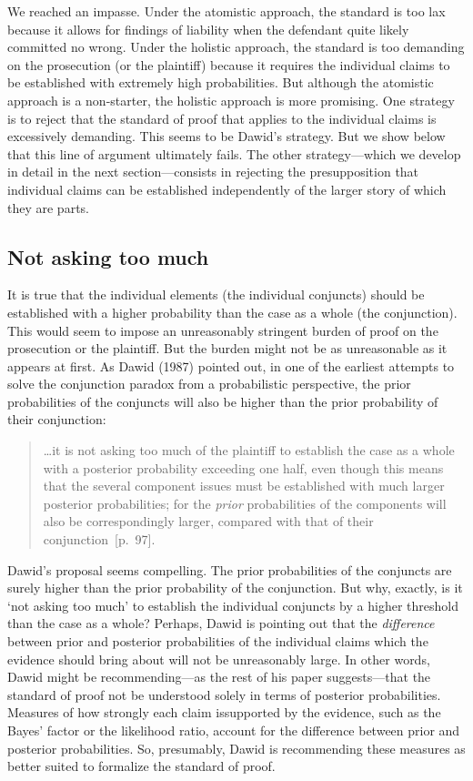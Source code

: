 \documentclass[
  10pt,
  dvipsnames,enabledeprecatedfontcommands]{scrartcl}
\begin{document}
We reached an impasse. Under the atomistic approach, the standard is too
lax because it allows for findings of liability when the defendant quite
likely committed no wrong. Under the holistic approach, the standard is
too demanding on the prosecution (or the plaintiff) because it requires
the individual claims to be established with extremely high
probabilities. But although the atomistic approach is a non-starter, the
holistic approach is more promising. One strategy is to reject that the
standard of proof that applies to the individual claims is excessively
demanding. This seems to be Dawid's strategy. But we show below that
this line of argument ultimately fails. The other strategy---which we
develop in detail in the next section---consists in rejecting the
presupposition that individual claims can be established independently
of the larger story of which they are parts.

\hypertarget{not-asking-too-much}{%
\subsection{Not asking too much}\label{not-asking-too-much}}

It is true that the individual elements (the individual conjuncts)
should be established with a higher probability than the case as a whole
(the conjunction). This would seem to impose an unreasonably stringent
burden of proof on the prosecution or the plaintiff. But the burden
might not be as unreasonable as it appears at first. As Dawid (1987)
pointed out, in one of the earliest attempts to solve the conjunction
paradox from a probabilistic perspective, the prior probabilities of the
conjuncts will also be higher than the prior probability of their
conjunction:

\begin{quote}
\dots it is not asking too much of the plaintiff to establish the case as a whole with a posterior probability exceeding one half, even though this means  that the several component issues must be established with much larger posterior probabilities; for the \textit{prior}  probabilities of the components will also be correspondingly larger, compared with that of their conjunction~[p.~97].
 \end{quote}

Dawid's proposal seems compelling. The prior probabilities of the
conjuncts are surely higher than the prior probability of the
conjunction. But why, exactly, is it `not asking too much' to establish
the individual conjuncts by a higher threshold than the case as a whole?
Perhaps, Dawid is pointing out that the \textit{difference} between
prior and posterior probabilities of the individual claims which the
evidence should bring about will not be unreasonably large. In other
words, Dawid might be recommending---as the rest of his paper
suggests---that the standard of proof not be understood solely in terms
of posterior probabilities. Measures of how strongly each claim
issupported by the evidence, such as the Bayes' factor or the likelihood
ratio, account for the difference between prior and posterior
probabilities. So, presumably, Dawid is recommending these measures as
better suited to formalize the standard of proof.
\end{document}
